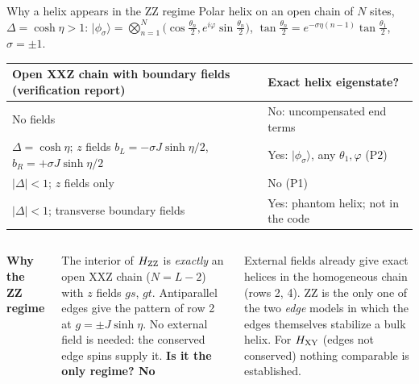 \documentclass[aspectratio=169,10pt]{beamer}
\newcommand{\ket}[1]{\lvert #1\rangle}
\newcommand{\sechead}[1]{{\color{sea}\bfseries #1}\par\vspace{1mm}}
\newcommand{\noteinline}[1]{{\color{muted}\footnotesize #1}}
\begin{document}
\begin{frame}{Why a helix appears in the ZZ regime}
\noteinline{Polar helix on an open chain of \(N\) sites, \(\Delta=\cosh\eta>1\): \(\ket{\phi_\sigma}=\bigotimes_{n=1}^{N}\bigl(\cos\tfrac{\theta_n}{2},e^{i\varphi}\sin\tfrac{\theta_n}{2}\bigr)\), \(\tan\tfrac{\theta_n}{2}=e^{-\sigma\eta(n-1)}\tan\tfrac{\theta_1}{2}\), \(\sigma=\pm1\).}
\par\vspace{.05cm}
\renewcommand{\arraystretch}{1.1}
{\footnotesize
\begin{tabular}{@{}>{\raggedright\arraybackslash}p{7.6cm}>{\raggedright\arraybackslash}p{6.1cm}@{}}
\toprule
\textbf{Open XXZ chain with boundary fields (verification report)} & \textbf{Exact helix eigenstate?}\\
\midrule
No fields & No: uncompensated end terms\\
\(\Delta=\cosh\eta\); \(z\) fields \(b_L=-\sigma J\sinh\eta/2\), \(b_R=+\sigma J\sinh\eta/2\) & Yes: \(\ket{\phi_\sigma}\), any \(\theta_1,\varphi\) (P2)\\
\(|\Delta|<1\); \(z\) fields only & No (P1)\\
\(|\Delta|<1\); transverse boundary fields & Yes: phantom helix; not in the code\\
\bottomrule
\end{tabular}
}
\par\vspace{.35cm}
\begin{columns}[T,onlytextwidth]
\sechead{Why the ZZ regime}
The interior of \(H_{\rm ZZ}\) is \emph{exactly} an open XXZ chain (\(N=L-2\)) with \(z\) fields \(gs\), \(gt\). Antiparallel edges give the pattern of row 2 at \(g=\pm J\sinh\eta\). No external field is needed: the conserved edge spins supply it.
\sechead{Is it the only regime? No}
External fields already give exact helices in the homogeneous chain (rows 2, 4). ZZ is the only one of the two \emph{edge} models in which the edges themselves stabilize a bulk helix. For \(H_{\rm XY}\) (edges not conserved) nothing comparable is established.
\end{columns}
\end{frame}
\end{document}
